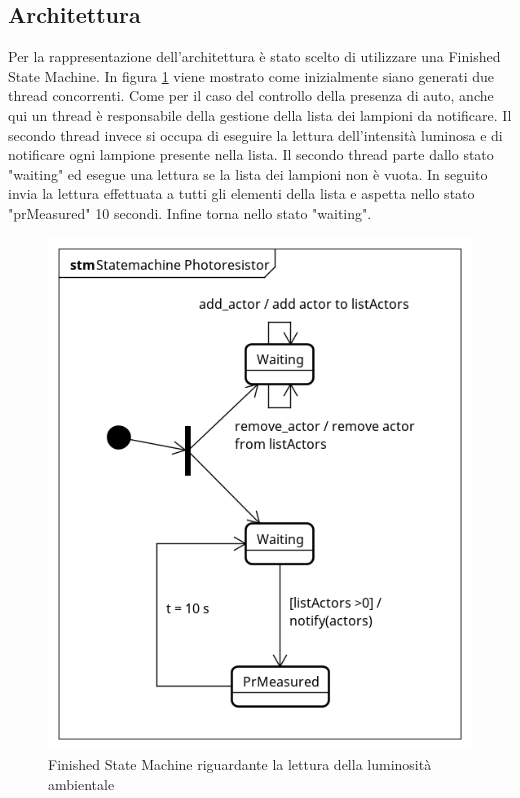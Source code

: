 \subsection{Architettura}

Per la rappresentazione dell'architettura è stato scelto di utilizzare una Finished State Machine.
In figura \ref{FSM PR} viene mostrato come inizialmente siano generati due thread concorrenti. Come per il caso del controllo della presenza di auto, anche qui un thread è responsabile della gestione della lista dei lampioni da notificare. Il secondo thread invece si occupa di eseguire la lettura dell'intensità luminosa e di notificare ogni lampione presente nella lista.
Il secondo thread parte dallo stato "waiting" ed esegue una lettura se la lista dei lampioni non è vuota. In seguito invia la lettura effettuata a tutti gli elementi della lista e aspetta nello stato "prMeasured" 10 secondi. Infine torna nello stato "waiting".


\begin{figure}[tbp]
	\centering
	\includegraphics[scale=.8]{figure/Statemachine_Photoresistor.png}
	\caption{Finished State Machine riguardante la lettura della luminosità ambientale \label{FSM PR}}
\end{figure}
\newpage

